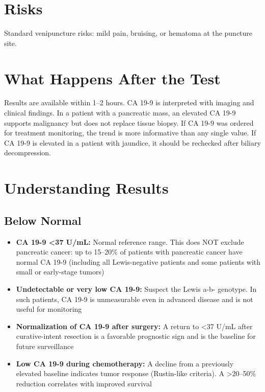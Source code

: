 \section*{Risks}
Standard venipuncture risks: mild pain, bruising, or hematoma at the puncture site.

\section*{What Happens After the Test}
Results are available within 1--2 hours. CA 19-9 is interpreted with imaging and clinical findings. In a patient with a pancreatic mass, an elevated CA 19-9 supports malignancy but does not replace tissue biopsy. If CA 19-9 was ordered for treatment monitoring, the trend is more informative than any single value. If CA 19-9 is elevated in a patient with jaundice, it should be rechecked after biliary decompression.

\section*{Understanding Results}

\subsection*{Below Normal}
\begin{itemize}
  \item \textbf{CA 19-9 <37 U/mL:} Normal reference range. This does NOT exclude pancreatic cancer: up to 15--20\% of patients with pancreatic cancer have normal CA 19-9 (including all Lewis-negative patients and some patients with small or early-stage tumors)
  \item \textbf{Undetectable or very low CA 19-9:} Suspect the Lewis a-b- genotype. In such patients, CA 19-9 is unmeasurable even in advanced disease and is not useful for monitoring
  \item \textbf{Normalization of CA 19-9 after surgery:} A return to <37 U/mL after curative-intent resection is a favorable prognostic sign and is the baseline for future surveillance
  \item \textbf{Low CA 19-9 during chemotherapy:} A decline from a previously elevated baseline indicates tumor response (Rustin-like criteria). A >20--50\% reduction correlates with improved survival
\end{itemize}

